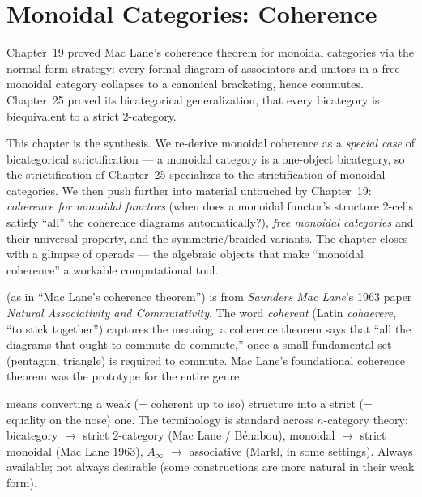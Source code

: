 
\chapter{Monoidal Categories: Coherence}

\begin{overviewbox}
Chapter~19 proved Mac Lane's coherence theorem for monoidal categories via
the normal-form strategy: every formal diagram of associators and unitors
in a free monoidal category collapses to a canonical bracketing, hence
commutes. Chapter~25 proved its bicategorical generalization, that every
bicategory is biequivalent to a strict 2-category.

This chapter is the synthesis. We re-derive monoidal coherence as a
\emph{special case} of bicategorical strictification — a monoidal category
is a one-object bicategory, so the strictification of Chapter~25 specializes
to the strictification of monoidal categories. We then push further into
material untouched by Chapter~19: \emph{coherence for monoidal functors}
(when does a monoidal functor's structure 2-cells satisfy ``all'' the
coherence diagrams automatically?), \emph{free monoidal categories} and
their universal property, and the symmetric/braided variants. The chapter
closes with a glimpse of operads — the algebraic objects that make
``monoidal coherence'' a workable computational tool.
\end{overviewbox}


\begin{nameorigin}
 (as in ``Mac Lane's coherence theorem'') is from
\emph{Saunders Mac Lane}'s 1963 paper \emph{Natural Associativity and
Commutativity}. The word \emph{coherent} (Latin \emph{cohaerere}, ``to
stick together'') captures the meaning: a coherence theorem says that
``all the diagrams that ought to commute do commute,'' once a small
fundamental set (pentagon, triangle) is required to commute. Mac Lane's
foundational coherence theorem was the prototype for the entire genre.

 means converting a weak (= coherent up to iso)
structure into a strict (= equality on the nose) one. The terminology
is standard across $n$-category theory: bicategory $\to$ strict
$2$-category (Mac Lane / Bénabou), monoidal $\to$ strict monoidal
(Mac Lane 1963), $A_\infty$ $\to$ associative (Markl, in some settings).
Always available; not always desirable (some constructions are more
natural in their weak form).
\end{nameorigin}

